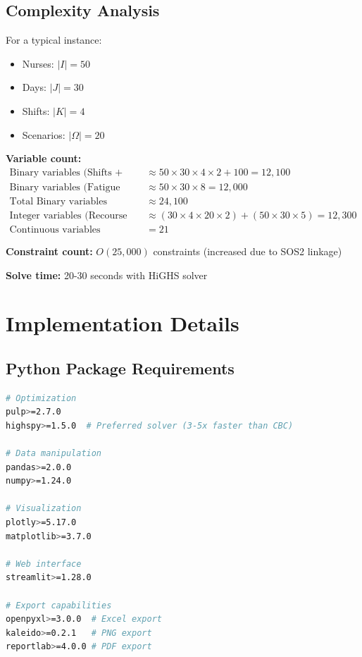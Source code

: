 \documentclass[12pt,a4paper]{article}
\begin{document}
\subsection{Complexity Analysis}

For a typical instance:
\begin{itemize}
    \item Nurses: $|I| = 50$
    \item Days: $|J| = 30$
    \item Shifts: $|K| = 4$
    \item Scenarios: $|\Omega| = 20$
\end{itemize}

\textbf{Variable count:}
\begin{align*}
\text{Binary variables (Shifts + indicators)} &\approx 50 \times 30 \times 4 \times 2 + 100 = 12,100 \\
\text{Binary variables (Fatigue SOS2 segments)} &\approx 50 \times 30 \times 8 = 12,000 \\
\text{Total Binary variables} &\approx 24,100 \\
\text{Integer variables (Recourse + Deviations)} &\approx (30 \times 4 \times 20 \times 2) + (50 \times 30 \times 5) = 12,300 \\
\text{Continuous variables} &= 21
\end{align*}

\textbf{Constraint count:} $O(25,000)$ constraints (increased due to SOS2 linkage)

\textbf{Solve time:} 20-30 seconds with HiGHS solver

\section{Implementation Details}

\subsection{Python Package Requirements}

\begin{lstlisting}[language=bash, caption=Required Python Packages]
# Optimization
pulp>=2.7.0
highspy>=1.5.0  # Preferred solver (3-5x faster than CBC)

# Data manipulation
pandas>=2.0.0
numpy>=1.24.0

# Visualization
plotly>=5.17.0
matplotlib>=3.7.0

# Web interface
streamlit>=1.28.0

# Export capabilities
openpyxl>=3.0.0  # Excel export
kaleido>=0.2.1   # PNG export
reportlab>=4.0.0 # PDF export
\end{lstlisting}
\end{document}
